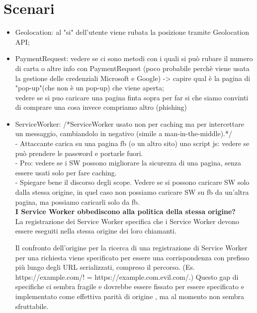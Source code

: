 \documentclass[italian]{article}
\begin{document}
\section{Scenari}
\begin{itemize}
\item Geolocation: al "si" dell'utente viene rubata la posizione tramite Geolocation API;
\\
\item PaymentRequest: vedere se ci sono metodi con i quali si può rubare il numero di carta o altre info con PaymentRequest (poco probabile perchè viene usata la gestione delle credenziali Microsoft e Google) -> capire qual è la pagina di "pop-up"(che non è un pop-up) che viene aperta;
\\
vedere se si puo caricare una pagina finta sopra per far si che siamo convinti di comprare una cosa invece compriamo altro (phishing)
\\
\item ServiceWorker: /*ServiceWorker usato non per caching ma per intercettare un messaggio, cambiandolo in negativo (simile a man-in-the-middle).*/
\\
- Attaccante carica su una pagina fb (o un altro sito) uno script js: vedere se può prendere le password e portarle fuori.
\\
- Pro: vedere se i SW possono migliorare la sicurezza di una pagina, senza essere usati solo per fare caching.
\\
- Spiegare bene il discorso degli scope.
Vedere se si possono caricare SW solo dalla stessa origine, in quel caso non possiamo caricare SW su fb da un'altra pagina, ma possiamo caricarli solo da fb.
\\
\textbf{I Service Worker obbediscono alla politica della stessa origine?}
\\
La registrazione dei Service Worker specifica che i Service Worker devono essere eseguiti nella stessa origine dei loro chiamanti.

Il confronto dell'origine per la ricerca di una registrazione di Service Worker per una richiesta viene specificato per essere una corrispondenza con prefisso più lungo degli URL serializzati, compreso il percorso. (Es. https://example.com/! = https://example.com.evil.com/.) 
Questo gap di specifiche ci sembra fragile e dovrebbe essere fissato per essere specificato e implementato come effettiva parità di origine , ma al momento non sembra sfruttabile.


\end{itemize}
\end{document}
